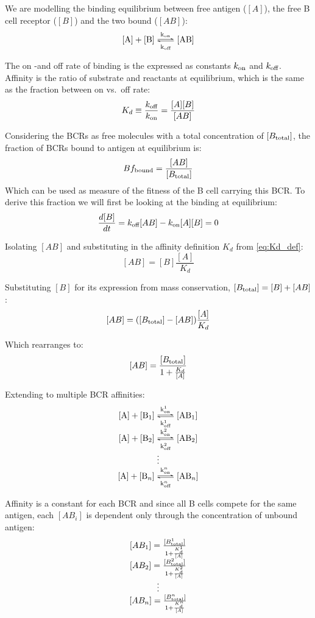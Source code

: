 We are modelling the binding equilibrium between free antigen ($[A]$), the free B cell receptor ($[B]$) and the two bound ($[AB]$):
\begin{equation}
\ce{[A] + [B] <=>[k_{\on}][k_{\off}] [AB]}
  \label{eq:bind1}
\end{equation}

\noindent
The on -and off rate of binding is the expressed as constants $k_{\text{on}}$ and $k_{\text{off}}$. Affinity is the ratio of substrate and reactants at equilibrium, which is the same as the fraction between on vs.\ off rate:
\begin{equation}
K_d \equiv \frac{k_{\text{off}}}{k_{\text{on}}} = \frac{[A] [B]}{[AB]}
  \label{eq:Kd_def}
\end{equation}

\noindent
Considering the BCRs as free molecules with a total concentration of $[B_{\text{total}}]$, the fraction of BCRs bound to antigen at equilibrium is:
$$
Bf_{\text{bound}} = \frac{[AB]}{[B_{\text{total}}]}
$$
Which can be used as measure of the fitness of the B cell carrying this BCR.
To derive this fraction we will first be looking at the binding at equilibrium:
\begin{equation}
\frac{d[B]}{dt} = k_{\text{off}} [AB] - k_{\text{on}} [A] [B] = 0
  \label{eq:equilibrium}
\end{equation}

\noindent
Isolating $[AB]$ and substituting in the affinity definition $K_d$ from \eqref{eq:Kd_def}:
$$
[AB] = [B] \frac{[A]}{K_d}
$$

\noindent
Substituting $[B]$ for its expression from mass conservation, $[B_{\text{total}}] = [B] + [AB]$:
$$
[AB] = ([B_{\text{total}}] - [AB]) \frac{[A]}{K_d}
$$

\noindent
Which rearranges to:
$$
[AB] = \frac{[B_{\text{total}}]}{1 + \frac{K_d}{[A]}}
$$

\noindent
Extending to multiple BCR affinities:
\[
 \begin{matrix}
  \ce{[A] + [B_1] <=>[k^1_{\on}][k^1_{\off}] [AB_1]} \\
  \ce{[A] + [B_2] <=>[k^2_{\on}][k^2_{\off}] [AB_2]} \\
  \vdots \\
  \ce{[A] + [B_n] <=>[k^n_{\on}][k^n_{\off}] [AB_n]}
 \end{matrix}
\]

\noindent
Affinity is a constant for each BCR and since all B cells compete for the same antigen, each $[AB_i]$ is dependent only through the concentration of unbound antigen:
\[
 \begin{matrix}
  [AB_1] = \frac{[B^1_{\text{total}}]}{1 + \frac{K^1_d}{[A]}} \\
  [AB_2] = \frac{[B^2_{\text{total}}]}{1 + \frac{K^2_d}{[A]}} \\
  \vdots \\
  [AB_n] = \frac{[B^n_{\text{total}}]}{1 + \frac{K^n_d}{[A]}} \\
 \end{matrix}
\]

